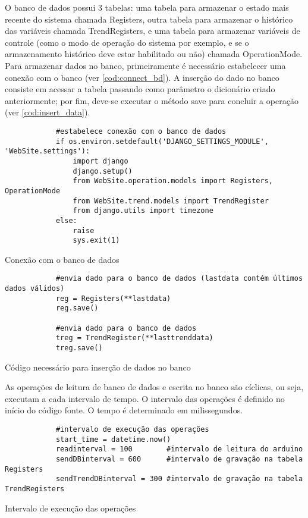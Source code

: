 		O banco de dados possui 3 tabelas: uma tabela para armazenar o estado mais recente do sistema chamada Registers, outra tabela para armazenar o histórico das variáveis chamada TrendRegisters, e uma tabela para armazenar variáveis de controle (como o modo de operação do sistema por exemplo, e se o armazenamento histórico deve estar habilitado ou não) chamada OperationMode. Para armazenar dados no banco, primeiramente é necessário estabelecer uma conexão com o banco (ver \autoref{cod:connect_bd}). A inserção do dado no banco consiste em acessar a tabela passando como parâmetro o dicionário criado anteriormente; por fim, deve-se executar o método save para concluir a operação (ver \autoref{cod:insert_data}).
		
		\begin{listing}[!htb]
			\begin{verbatim}
			#estabelece conexão com o banco de dados
			if os.environ.setdefault('DJANGO_SETTINGS_MODULE', 'WebSite.settings'):
				import django
				django.setup()
				from WebSite.operation.models import Registers, OperationMode
				from WebSite.trend.models import TrendRegister
				from django.utils import timezone
			else:
				raise
				sys.exit(1)
			\end{verbatim}
			\caption{Conexão com o banco de dados}
			\label{cod:connect_bd}
		\end{listing}
		
		\begin{listing}[!htb]
			\begin{verbatim}
			#envia dado para o banco de dados (lastdata contém últimos dados válidos)
			reg = Registers(**lastdata)
			reg.save()
			
			#envia dado para o banco de dados
			treg = TrendRegister(**lasttrenddata)
			treg.save()
			\end{verbatim}
			\caption{Código necessário para inserção de dados no banco}
			\label{cod:insert_data}
		\end{listing}
		
		As operações de leitura de banco de dados e escrita no banco são cíclicas, ou seja, executam a cada intervalo de tempo. O intervalo das operações é definido no início do código fonte. O tempo é determinado em milissegundos.
		
		\begin{listing}[!htb]
			\begin{verbatim}
			#intervalo de execução das operações
			start_time = datetime.now()
			readinterval = 100        #intervalo de leitura do arduino
			sendDBinterval = 600      #intervalo de gravação na tabela Registers
			sendTrendDBinterval = 300 #intervalo de gravação na tabela TrendRegisters
			\end{verbatim}
			\caption{Intervalo de execução das operações}
			\label{cod:set_interval}
		\end{listing}
		
